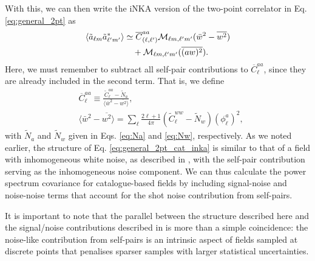 \documentclass[%
 reprint,
superscriptaddress,
nofootinbib,
 amsmath,amssymb,
 aps,
 prd,
]{revtex4-2}
\begin{document}
    With this, we can then write the iNKA version of the two-point correlator in Eq. \ref{eq:general_2pt} as
    \begin{align}\label{eq:general_2pt_cat_inka}
      \langle \tilde{a}_{\ell m}\tilde{a}^*_{\ell'm'}\rangle & \simeq \overline{C}^{aa}_{(\ell,\ell')}{\cal M}_{\ell m,\ell'm'}(\bar{w}^2-\overline{w^2}) \notag \\ & \quad +{\cal M}_{\ell m,\ell'm'}(\overline{(aw)^2}).
    \end{align}
    Here, we must remember to subtract all self-pair contributions to $\overline{C}^{aa}_\ell$, since they are already included in the second term. That is, we define
    \begin{align}
      &\overline{C}^{aa}_\ell\equiv\frac{\tilde{C}^{aa}_\ell-\tilde{N}_a}{\langle \bar{w}^2-\overline{w^2}\rangle},\\
      &\langle \bar{w}^2-\overline{w^2}\rangle=\sum_\ell\frac{2\ell+1}{4\pi}(\tilde{C}^{ww}_\ell-\tilde{N}_w)(\phi^a_\ell)^2,
    \end{align}
    with $\tilde{N}_a$ and $\tilde{N}_w$ given in Eqs. \ref{eq:Na} and \ref{eq:Nw}, respectively. As we noted earlier, the structure of Eq. \ref{eq:general_2pt_cat_inka} is similar to that of a field with inhomogeneous white noise, as described in \cite{2010.09717}, with the self-pair contribution serving as the inhomogeneous noise component. We can thus calculate the power spectrum covariance for catalogue-based fields by including signal-noise and noise-noise terms that account for the shot noise contribution from self-pairs.

    It is important to note that the parallel between the structure described here and the signal/noise contributions described in \cite{2010.09717} is more than a simple coincidence: the noise-like contribution from self-pairs is an intrinsic aspect of fields sampled at discrete points that penalises sparser samples with larger statistical uncertainties.
\end{document}
